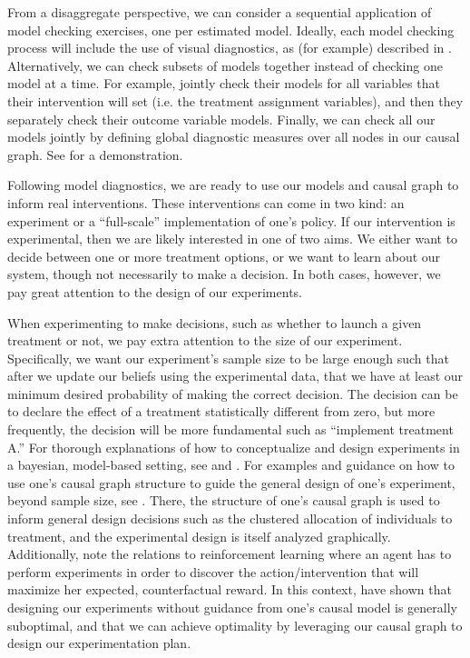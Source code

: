 From a disaggregate perspective, we can consider a sequential application of model checking exercises, one per estimated model.
Ideally, each model checking process will include the use of visual diagnostics, as (for example) described in \citet{brathwaite_2018_check}.
Alternatively, we can check subsets of models together instead of checking one model at a time.
For example, \citet{tran_2016_model} jointly check their models for all variables that their intervention will set (i.e. the treatment assignment variables), and then they separately check their outcome variable models.
Finally, we can check all our models jointly by defining global diagnostic measures over all nodes in our causal graph.
See \citet{williamson_2013_model} for a demonstration.

Following model diagnostics, we are ready to use our models and causal graph to inform real interventions.
These interventions can come in two kind: an experiment or a ``full-scale'' implementation of one's policy.
If our intervention is experimental, then we are likely interested in one of two aims.
We either want to decide between one or more treatment options, or we want to learn about our system, though not necessarily to make a decision.
In both cases, however, we pay great attention to the design of our experiments.

When experimenting to make decisions, such as whether to launch a given treatment or not, we pay extra attention to the size of our experiment.
Specifically, we want our experiment's sample size to be large enough such that after we update our beliefs using the experimental data, that we have at least our minimum desired probability of making the correct decision.
The decision can be to declare the effect of a treatment statistically different from zero, but more frequently, the decision will be more fundamental such as ``implement treatment A.''
For thorough explanations of how to conceptualize and design experiments in a bayesian, model-based setting, see \citet{chaloner_1995_bayesian} and \citet{wang_2002_simulation}.
For examples and guidance on how to use one's causal graph structure to guide the general design of one's experiment, beyond sample size, see \citet{madrigal_2007_cluster}.
There, the structure of one's causal graph is used to inform general design decisions such as the clustered allocation of individuals to treatment, and the experimental design is itself analyzed graphically.
Additionally, note the relations to reinforcement learning where an agent has to perform experiments in order to discover the action/intervention that will maximize her expected, counterfactual reward.
In this context, \citet{lee_2018_structural} have shown that designing our experiments without guidance from one's causal model is generally suboptimal, and that we can achieve optimality by leveraging our causal graph to design our experimentation plan.

